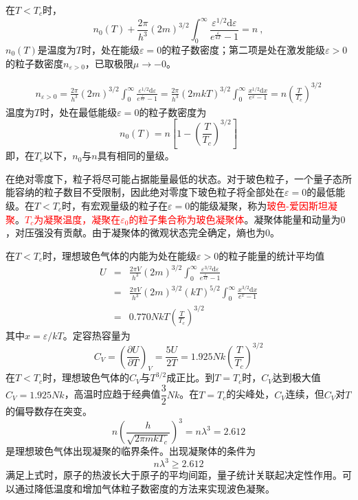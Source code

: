 \documentclass[12pt,a4paper]{article}
\newcommand{\dif}{\mathrm{d}}
\begin{document}
在$T < T_c$时，
\begin{equation}
n_0(T) +\frac{2\pi}{h^3} (2m)^{3/2} \int_0^\infty \frac{\varepsilon^{1/2} \dif \varepsilon}{e^{\frac{\varepsilon}{kT}} -1} = n ~,
\end{equation}
$n_0(T)$是温度为$T$时，处在能级$\varepsilon = 0$的粒子数密度；第二项是处在激发能级$\varepsilon > 0$的粒子数密度$n_{\varepsilon > 0}$，已取极限$\mu \rightarrow -0$。

\begin{eqnarray*}
n_{\varepsilon > 0} = \frac{2\pi}{h^3} (2m)^{3/2} \int_0^\infty \frac{\varepsilon^{1/2} \dif \varepsilon}{e^{\frac{\varepsilon}{kT}} -1}  = \frac{2\pi}{h^3} (2m kT)^{3/2} \int_0^\infty \frac{x^{1/2} \dif x}{e^{x} -1} = n\left(\frac{T}{T_c} \right)^{3/2}
\end{eqnarray*}
温度为$T$时，处在最低能级$\varepsilon = 0$的粒子数密度为
\begin{equation}
n_0(T) = n \left[1- \left(\frac{T}{T_c} \right)^{3/2}\right]
\end{equation}
即，在$T_c$以下，$n_0$与$n$具有相同的量级。

在绝对零度下，粒子将尽可能占据能量最低的状态。对于玻色粒子，一个量子态所能容纳的粒子数目不受限制，因此绝对零度下玻色粒子将全部处在$\varepsilon = 0$的最低能级。在$T < T_c$时，有宏观量级的粒子在$\varepsilon = 0$的能级凝聚，称为\textcolor{red}{玻色-爱因斯坦凝聚}。\textcolor{red}{$T_c$为凝聚温度，凝聚在$\varepsilon_0$的粒子集合称为玻色凝聚体}。凝聚体能量和动量为$0$，对压强没有贡献。由于凝聚体的微观状态完全确定，熵也为$0$。

在$T < T_c$时，理想玻色气体的内能为处在能级$\varepsilon > 0$的粒子能量的统计平均值
\begin{eqnarray*}
U &=& \frac{2\pi V}{h^3} (2m)^{3/2} \int_0^\infty \frac{\varepsilon^{3/2} \dif \varepsilon}{e^{\frac{\varepsilon}{kT}} -1} \\
&=& \frac{2\pi V}{h^3} (2m)^{3/2} (kT)^{5/2} \int_0^\infty \frac{x^{3/2} \dif x}{e^{x} -1} \\
&=& 0.770 NkT \left(\frac{T}{T_c} \right)^{3/2}
\end{eqnarray*}
其中$x = \varepsilon/kT$。定容热容量为
\begin{equation}
C_V = \left(\frac{\partial U}{\partial T} \right)_V = \frac{5U}{2T} = 1.925 Nk \left(\frac{T}{T_c} \right)^{3/2}
\end{equation}
在$T < T_c$时，理想玻色气体的$C_V$与$T^{3/2}$成正比。到$T = T_c$时，$C_V$达到极大值$C_V = 1.925 Nk$，高温时应趋于经典值$\dfrac{3}{2} Nk$。在$T = T_c$的尖峰处，$C_V$连续，但$C_V$对$T$的偏导数存在突变。
\begin{equation}
n \left(\frac{h}{\sqrt{2\pi m k T_c} }  \right)^3 = n \lambda^3 = 2.612
\end{equation}
是理想玻色气体出现凝聚的临界条件。出现凝聚体的条件为
\begin{equation}
n \lambda^3 \geqslant 2.612
\end{equation}
满足上式时，原子的热波长大于原子的平均间距，量子统计关联起决定性作用。可以通过降低温度和增加气体粒子数密度的方法来实现波色凝聚。
\end{document}

